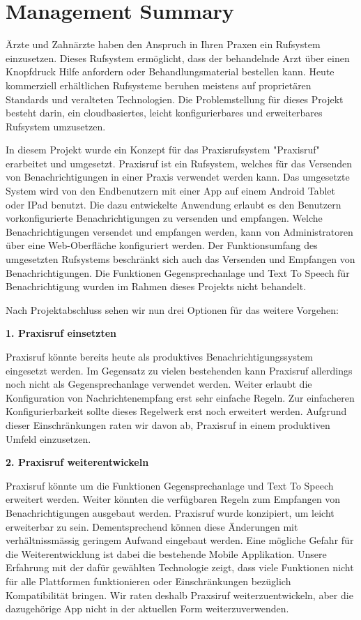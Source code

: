 \section*{Management Summary}

Ärzte und Zahnärzte haben den Anspruch in Ihren Praxen ein Rufsystem einzusetzen.
Dieses Rufsystem ermöglicht, dass der behandelnde Arzt über einen Knopfdruck Hilfe anfordern oder Behandlungsmaterial bestellen kann.
Heute kommerziell erhältlichen Rufsysteme beruhen meistens auf proprietären Standards und veralteten Technologien.\cite{aufgabenstellung}
Die Problemstellung für dieses Projekt besteht darin, ein cloudbasiertes, leicht konfigurierbares und erweiterbares Rufsystem umzusetzen.

In diesem Projekt wurde ein Konzept für das Praxisrufsystem "Praxisruf" erarbeitet und umgesetzt.
Praxisruf ist ein Rufsystem, welches für das Versenden von Benachrichtigungen in einer Praxis verwendet werden kann.
Das umgesetzte System wird von den Endbenutzern mit einer App auf einem Android Tablet oder IPad benutzt.
Die dazu entwickelte Anwendung erlaubt es den Benutzern vorkonfigurierte Benachrichtigungen zu versenden und empfangen.
Welche Benachrichtigungen versendet und empfangen werden, kann von Administratoren über eine Web-Oberfläche konfiguriert werden.
Der Funktionsumfang des umgesetzten Rufsystems beschränkt sich auch das Versenden und Empfangen von Benachrichtigungen.
Die Funktionen Gegensprechanlage und Text To Speech für Benachrichtigung wurden im Rahmen dieses Projekts nicht behandelt.

Nach Projektabschluss sehen wir nun drei Optionen für das weitere Vorgehen:


\textbf{1. Praxisruf einsetzten}

Praxisruf könnte bereits heute als produktives Benachrichtigungssystem eingesetzt werden.
Im Gegensatz zu vielen bestehenden kann Praxisruf allerdings noch nicht als Gegensprechanlage verwendet werden.
Weiter erlaubt die Konfiguration von Nachrichtenempfang erst sehr einfache Regeln.
Zur einfacheren Konfigurierbarkeit sollte dieses Regelwerk erst noch erweitert werden.
Aufgrund dieser Einschränkungen raten wir davon ab, Praxisruf in einem produktiven Umfeld einzusetzen.

\textbf{2. Praxisruf weiterentwickeln}

Praxisruf könnte um die Funktionen Gegensprechanlage und Text To Speech erweitert werden.
Weiter könnten die verfügbaren Regeln zum Empfangen von Benachrichtigungen ausgebaut werden.
Praxisruf wurde konzipiert, um leicht erweiterbar zu sein.
Dementsprechend können diese Änderungen mit verhältnissmässig geringem Aufwand eingebaut werden.
Eine mögliche Gefahr für die Weiterentwicklung ist dabei die bestehende Mobile Applikation.
Unsere Erfahrung mit der dafür gewählten Technologie zeigt, dass viele Funktionen nicht für alle Plattformen funktionieren
oder Einschränkungen bezüglich Kompatibilität bringen.
Wir raten deshalb Praxsiruf weiterzuentwickeln, aber die dazugehörige App nicht in der aktuellen Form weiterzuverwenden.

